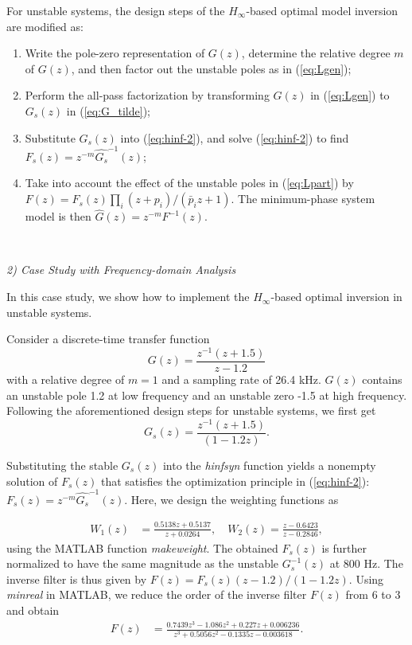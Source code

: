 \documentclass [11pt, proquest] {uwthesis}[2020/02/24]
\begin{document}
For unstable systems, the design steps of the $H_{\infty}$-based
optimal model inversion are modified as:
\begin{enumerate}
\item Write the pole-zero representation of $G(z)$, determine the relative
degree $m$ of $G(z)$, and then factor out the unstable poles as
in (\ref{eq:Lgen});
\item Perform the all-pass factorization by transforming $G(z)$ in (\ref{eq:Lgen})
to $G_{s}(z)$ in (\ref{eq:G_tilde});
\item Substitute $G_{s}(z)$ into (\ref{eq:hinf-2}), and solve (\ref{eq:hinf-2})
to find $F_{s}(z)=z^{-m}\hat{G_{s}}^{-1}(z)$;
\item Take into account the effect of the unstable poles in (\ref{eq:Lpart})
by $F(z)=F_{s}(z)\prod_{i}(z+p_{i})/(\bar{p}_{i}z+1)$. The minimum-phase
system model is then $\hat{G}(z)=z^{-m}F^{-1}(z)$.
\end{enumerate}
\

\noindent \emph{2) Case Study with Frequency-domain Analysis}

In this case study, we show how to implement the $H_{\infty}$-based
optimal inversion in unstable systems.

Consider a discrete-time transfer function
\begin{equation}
G(z)=\frac{z^{-1}(z+1.5)}{z-1.2}\label{eq:Gz_unstable}
\end{equation}
with a relative degree of $m=1$ and a sampling rate of 26.4 kHz.
$G(z)$ contains an unstable pole 1.2 at low frequency and an unstable
zero -1.5 at high frequency. Following the aforementioned design steps
for unstable systems, we first get
\begin{equation}
G_{s}(z)=\frac{z^{-1}(z+1.5)}{(1-1.2z)}.\label{eq:Gz_tilde_unstable}
\end{equation}

Substituting the stable $G_{s}(z)$ into the \emph{hinfsyn }function
yields a nonempty solution of $F_{s}(z)$ that satisfies the optimization
principle in (\ref{eq:hinf-2}): $F_{s}(z)=z^{-m}\hat{G_{s}}^{-1}(z)$.
Here, we design the weighting functions as

\begin{align*}
W_{1}(z) & =\frac{0.5138z+0.5137}{z+0.0264},\quad W_{2}(z)=\frac{z-0.6423}{z-0.2846},
\end{align*}
using the MATLAB function \emph{makeweight}. The obtained $F_{s}(z)$
is further normalized to have the same magnitude as the unstable $G_{s}^{-1}(z)$
at 800 Hz. The inverse filter is thus given by $F(z)=F_{s}(z)(z-1.2)/(1-1.2z).$
Using \emph{minreal} in MATLAB, we reduce the order of the inverse
filter $F(z)$ from 6 to 3 and obtain
\begin{align*}
F(z) & =\frac{0.7439z^{3}-1.086z^{2}+0.227z+0.006236}{z^{3}+0.5056z^{2}-0.1335z-0.003618}.
\end{align*}
\end{document}
